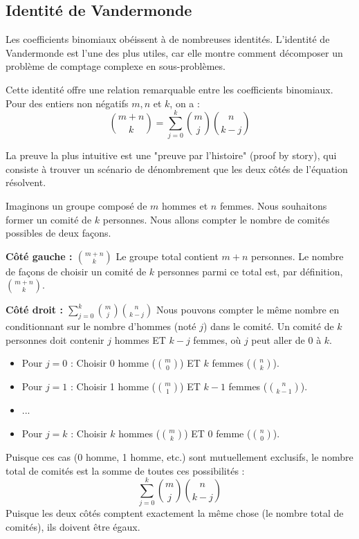 \newpage

\subsection{Identité de Vandermonde}

Les coefficients binomiaux obéissent à de nombreuses identités. L'identité de Vandermonde est l'une des plus utiles, car elle montre comment décomposer un problème de comptage complexe en sous-problèmes.

\begin{theorembox}
Cette identité offre une relation remarquable entre les coefficients binomiaux. Pour des entiers non négatifs $m, n$ et $k$, on a :
$$ \binom{m+n}{k} = \sum_{j=0}^{k} \binom{m}{j} \binom{n}{k-j} $$
\end{theorembox}

La preuve la plus intuitive est une "preuve par l'histoire" (proof by story), qui consiste à trouver un scénario de dénombrement que les deux côtés de l'équation résolvent.

\begin{proofbox}
Imaginons un groupe composé de $m$ hommes et $n$ femmes. Nous souhaitons former un comité de $k$ personnes. Nous allons compter le nombre de comités possibles de deux façons.

\textbf{Côté gauche : $\binom{m+n}{k}$}
Le groupe total contient $m+n$ personnes. Le nombre de façons de choisir un comité de $k$ personnes parmi ce total est, par définition, $\binom{m+n}{k}$.

\textbf{Côté droit : $\sum_{j=0}^{k} \binom{m}{j} \binom{n}{k-j}$}
Nous pouvons compter le même nombre en conditionnant sur le nombre d'hommes (noté $j$) dans le comité. Un comité de $k$ personnes doit contenir $j$ hommes ET $k-j$ femmes, où $j$ peut aller de $0$ à $k$.
\begin{itemize}
    \item Pour $j=0$ : Choisir 0 homme ($\binom{m}{0}$) ET $k$ femmes ($\binom{n}{k}$).
    \item Pour $j=1$ : Choisir 1 homme ($\binom{m}{1}$) ET $k-1$ femmes ($\binom{n}{k-1}$).
    \item ...
    \item Pour $j=k$ : Choisir $k$ hommes ($\binom{m}{k}$) ET 0 femme ($\binom{n}{0}$).
\end{itemize}
Puisque ces cas (0 homme, 1 homme, etc.) sont mutuellement exclusifs, le nombre total de comités est la somme de toutes ces possibilités :
\[ \sum_{j=0}^{k} \binom{m}{j} \binom{n}{k-j} \]
Puisque les deux côtés comptent exactement la même chose (le nombre total de comités), ils doivent être égaux.
\end{proofbox}

